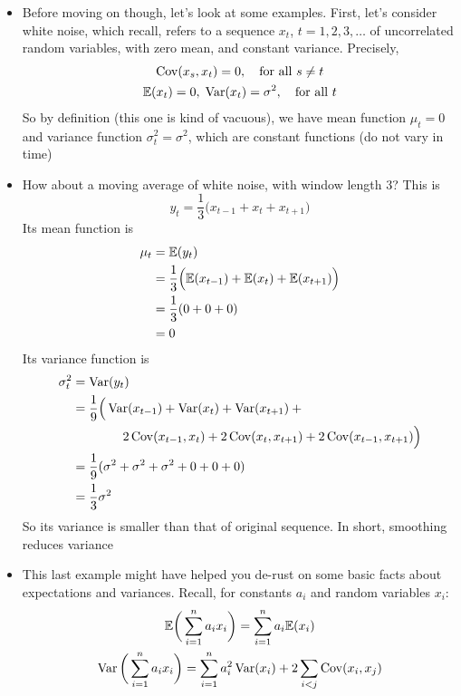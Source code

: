 \documentclass{article}
\begin{document}
\begin{itemize}
\item Before moving on though, let's look at some examples. First, let's
  consider white noise, which recall, refers to a sequence $x_t$, $t =
  1,2,3,\dots$ of uncorrelated random variables, with zero mean, and constant
  variance. Precisely,   
  \begin{gather*}
  \operatorname{Cov}(x_s, x_t) = 0, \quad \text{for all $s \not= t$} \\
  \mathbb{E}(x_t) = 0, \; \operatorname{Var}(x_t) = \sigma^2, \quad \text{for all $t$} 
  \end{gather*}
  So by definition (this one is kind of vacuous), we have mean function $\mu_t =
  0$ and variance function $\sigma^2_t = \sigma^2$, which are constant functions
  (do not vary in time)

\item How about a moving average of white noise, with window length 3? This is 
  \[
  y_t = \frac{1}{3} \Big( x_{t-1} + x_t + x_{t+1} \Big)
  \]
  Its mean function is
  \begin{align*}
  \mu_t &= \mathbb{E}(y_t)  \\
  &= \frac{1}{3} \Big( \mathbb{E}(x_{t-1}) + \mathbb{E}(x_t) + \mathbb{E}(x_{t+1}) \Big) \\ 
  &= \frac{1}{3} ( 0 + 0 + 0 ) \\
  &= 0
  \end{align*}
  Its variance function is
  \begin{align*}
  \sigma^2_t &= \operatorname{Var}(y_t) \\
  &= \frac{1}{9} \Big( \operatorname{Var}(x_{t-1}) + \operatorname{Var}(x_t) + \operatorname{Var}(x_{t+1}) +{} \\
  &\qquad\qquad 2 \operatorname{Cov}(x_{t-1}, x_t) + 2 \operatorname{Cov}(x_t, x_{t+1}) + 2 \operatorname{Cov}(x_{t-1}, 
    x_{t+1}) \Big) \\
  &= \frac{1}{9} ( \sigma^2 + \sigma^2 + \sigma^2 + 0 + 0 + 0) \\
  &= \frac{1}{3} \sigma^2
  \end{align*}
  So its variance is smaller than that of original sequence. In short, smoothing
  reduces variance 

\item This last example might have helped you de-rust on some basic facts about
  expectations and variances. Recall, for constants $a_i$ and random variables
  $x_i$: 
  \begin{gather*}
  \mathbb{E}\bigg( \sum_{i=1}^n a_i x_i \bigg) = \sum_{i=1}^n a_i \mathbb{E}(x_i) \\
  \operatorname{Var}\bigg( \sum_{i=1}^n a_i x_i \bigg) = \sum_{i=1}^n a_i^2 \operatorname{Var}(x_i) + 2
  \sum_{i < j} \operatorname{Cov}(x_i, x_j) 
  \end{gather*}


\end{itemize}
\end{document}
